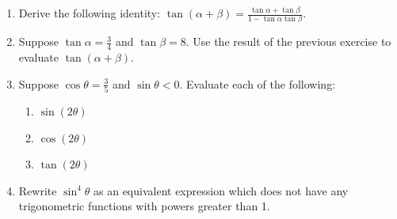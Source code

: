 \documentclass[12pt]{article}
\newif\ifans
\begin{document}
\begin{enumerate}
\item Derive the following identity: $\tan{(\alpha+\beta)}=\frac{\tan\alpha+\tan\beta}{1-\tan\alpha\tan\beta}$.

\ifans\fbox{\parbox{1\linewidth}{We will begin on the left hand side, applying a series of trigonometric identities until we arrive at the desired conclusion:
\begin{align*}
\tan(\alpha+\beta) &=\frac{\sin(\alpha+\beta)}{\cos(\alpha+\beta)} && \text{By definition of tangent.}\\
&=\frac{\sin\alpha\cos\beta+\cos\alpha\sin\beta}{\cos\alpha\cos\beta-\sin\alpha\sin\beta} && \text{By the sum identities for sine and cosine.}\\
&=\frac{\sin\alpha\cos\beta+\cos\alpha\sin\beta}{\cos\alpha\cos\beta-\sin\alpha\sin\beta}\cdot\frac{\frac{1}{\cos\alpha\cos\beta}}{\frac{1}{\cos\alpha\cos\beta}}\\
&=\frac{\frac{\sin\alpha}{\cos\alpha}+\frac{\sin\beta}{\cos\beta}}{1-\frac{\sin\alpha\sin\beta}{\cos\alpha\cos\beta}}\\
&=\frac{\tan\alpha+\tan\beta}{1-\tan\alpha\tan\beta}
\end{align*}}} \fi

\item Suppose $\tan\alpha=\frac{3}{4}$ and $\tan\beta=8$.  Use the result of the previous exercise to evaluate $\tan(\alpha+\beta)$.

\ifans\fbox{$-\frac{7}{4}$} \fi

\item Suppose $\cos\theta=\frac{3}{5}$ and $\sin\theta<0$.  Evaluate each of the following:

\begin{enumerate}

\item $\sin{(2\theta)}$

\ifans\fbox{$-\frac{24}{25}$} \fi

\item $\cos{(2\theta)}$

\ifans\fbox{$-\frac{7}{25}$} \fi

\item $\tan{(2\theta)}$

\ifans\fbox{$\frac{24}{7}$} \fi

\end{enumerate}

\item Rewrite $\sin^4\theta$ as an equivalent expression which does not have any trigonometric functions with powers greater than 1.


\end{enumerate}
\end{document}
